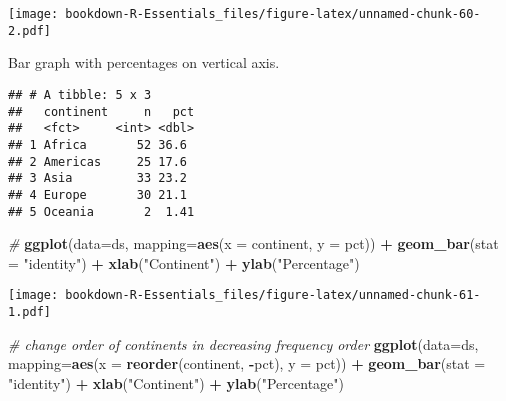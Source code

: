 \documentclass[
]{book}
\newenvironment{Shaded}{\begin{snugshade}}{\end{snugshade}}
\newcommand{\CommentTok}[1]{\textcolor[rgb]{0.56,0.35,0.01}{\textit{#1}}}
\newcommand{\DataTypeTok}[1]{\textcolor[rgb]{0.13,0.29,0.53}{#1}}
\newcommand{\DecValTok}[1]{\textcolor[rgb]{0.00,0.00,0.81}{#1}}
\newcommand{\KeywordTok}[1]{\textcolor[rgb]{0.13,0.29,0.53}{\textbf{#1}}}
\newcommand{\NormalTok}[1]{#1}
\newcommand{\OperatorTok}[1]{\textcolor[rgb]{0.81,0.36,0.00}{\textbf{#1}}}
\newcommand{\StringTok}[1]{\textcolor[rgb]{0.31,0.60,0.02}{#1}}
\begin{document}
\texttt{[image: bookdown-R-Essentials\_files/figure-latex/unnamed-chunk-60-2.pdf]}

Bar graph with percentages on vertical axis.

\begin{Shaded}
\end{Shaded}

\begin{verbatim}
## # A tibble: 5 x 3
##   continent     n   pct
##   <fct>     <int> <dbl>
## 1 Africa       52 36.6 
## 2 Americas     25 17.6 
## 3 Asia         33 23.2 
## 4 Europe       30 21.1 
## 5 Oceania       2  1.41
\end{verbatim}

\begin{Shaded}
\begin{Highlighting}[]
\CommentTok{#}
\KeywordTok{ggplot}\NormalTok{(}\DataTypeTok{data=}\NormalTok{ds, }\DataTypeTok{mapping=}\KeywordTok{aes}\NormalTok{(}\DataTypeTok{x =}\NormalTok{ continent, }\DataTypeTok{y =}\NormalTok{ pct)) }\OperatorTok{+}\StringTok{ }
\StringTok{  }\KeywordTok{geom_bar}\NormalTok{(}\DataTypeTok{stat =} \StringTok{"identity"}\NormalTok{) }\OperatorTok{+}\StringTok{ }
\StringTok{  }\KeywordTok{xlab}\NormalTok{(}\StringTok{"Continent"}\NormalTok{) }\OperatorTok{+}\StringTok{ }\KeywordTok{ylab}\NormalTok{(}\StringTok{"Percentage"}\NormalTok{)}
\end{Highlighting}
\end{Shaded}

\texttt{[image: bookdown-R-Essentials\_files/figure-latex/unnamed-chunk-61-1.pdf]}

\begin{Shaded}
\begin{Highlighting}[]
\CommentTok{# change order of continents in decreasing frequency order}
\KeywordTok{ggplot}\NormalTok{(}\DataTypeTok{data=}\NormalTok{ds, }\DataTypeTok{mapping=}\KeywordTok{aes}\NormalTok{(}\DataTypeTok{x =} \KeywordTok{reorder}\NormalTok{(continent, }\OperatorTok{-}\NormalTok{pct), }\DataTypeTok{y =}\NormalTok{ pct)) }\OperatorTok{+}\StringTok{ }
\StringTok{  }\KeywordTok{geom_bar}\NormalTok{(}\DataTypeTok{stat =} \StringTok{"identity"}\NormalTok{) }\OperatorTok{+}\StringTok{ }
\StringTok{  }\KeywordTok{xlab}\NormalTok{(}\StringTok{"Continent"}\NormalTok{) }\OperatorTok{+}\StringTok{ }\KeywordTok{ylab}\NormalTok{(}\StringTok{"Percentage"}\NormalTok{)}
\end{Highlighting}
\end{Shaded}
\end{document}
